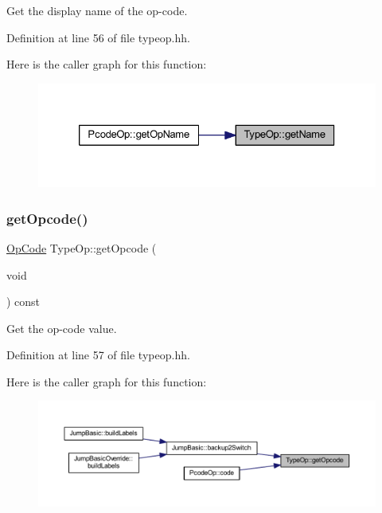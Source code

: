 Get the display name of the op-\/code. 



Definition at line 56 of file typeop.\+hh.

Here is the caller graph for this function\+:
\nopagebreak
\begin{figure}[H]
\begin{center}
\leavevmode
\includegraphics[width=326pt]{class_type_op_a66dc6a9447b6fb2482f2294ba0a2742b_icgraph}
\end{center}
\end{figure}
\mbox{\label{class_type_op_a5517454126d174242274a1be78a07779}} 
\subsubsection{\texorpdfstring{getOpcode()}{getOpcode()}}
{\footnotesize\ttfamily \mbox{\hyperlink{opcodes_8hh_abeb7dfb0e9e2b3114e240a405d046ea7}{Op\+Code}} Type\+Op\+::get\+Opcode (\begin{DoxyParamCaption}\item[{void}]{ }\end{DoxyParamCaption}) const\hspace{0.3cm}{\ttfamily [inline]}}



Get the op-\/code value. 



Definition at line 57 of file typeop.\+hh.

Here is the caller graph for this function\+:
\nopagebreak
\begin{figure}[H]
\begin{center}
\leavevmode
\includegraphics[width=350pt]{class_type_op_a5517454126d174242274a1be78a07779_icgraph}
\end{center}
\end{figure}
\mbox{\label{class_type_op_a42a1ffa77f998df24efdb44405b33ac5}} 
